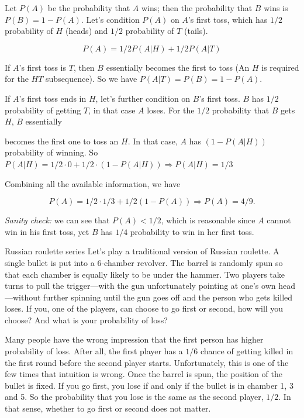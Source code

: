 \begin{solution}
Let $P(A)$ be the probability that $A$ wins; then the probability that $B$ wins is
$P(B)=1-P(A)$. Let's condition $P(A)$ on $A$'s first toss, which has $1/2$ probability of $H$
(heads) and $1/2$ probability of $T$ (tails).

\[
P(A)=1/2P(A\vert H)+1/2P(A\vert T)
\]

If $A$'s first toss is $T$, then $B$ essentially becomes the first to toss (An $H$ is required for the
$HT$ subsequence). So we have $P(A\vert T)=P(B)=1-P(A)$.

If $A$'s first toss ends in $H$, let's further condition on $B$'s first toss. $B$ has $1/2$ probability
of getting $T$, in that case $A$ loses. For the $1/2$ probability that $B$ gets $H$, $B$ essentially

becomes the first one to toss an $H$. In that case, $A$ has $(1-P(A\vert H))$ probability of
winning. So $P(A\vert H)=1/2\cdot0+1/2\cdot(1-P(A\vert H))\Rightarrow P(A\vert H)=1/3$

Combining all the available information, we have

\[
P(A)=1/2\cdot1/3+1/2(1-P(A))\Rightarrow P(A)=4/9.
\]

\emph{Sanity check:} we can see that $P(A)<1/2$, which is reasonable since $A$ cannot win in his
first toss, yet $B$ has $1/4$ probability to win in her first toss.

\end{solution}

\begin{problem}{Russian roulette series}
Let's play a traditional version of Russian roulette. A single bullet is put into a 6-chamber
revolver. The barrel is randomly spun so that each chamber is equally likely to be under the
hammer. Two players take turns to pull the trigger---with the gun unfortunately pointing at one's own head---without further spinning until the gun goes
off and the person who gets killed loses. If you, one of the players, can choose to go first
or second, how will you choose? And what is your probability of loss?
\end{problem}

\begin{solution}
Many people have the wrong impression that the first person has higher probability of loss.
After all, the first player has a $1/6$ chance of getting killed in the first round before the second
player starts. Unfortunately, this is one of the few times that intuition is wrong. Once the barrel is
spun, the position of the bullet is fixed. If you go first, you lose if and only if the bullet is in
chamber 1, 3 and 5. So the probability that you lose is the same as the second player, $1/2$. In that sense,
whether to go first or second does not matter.
\end{solution}

